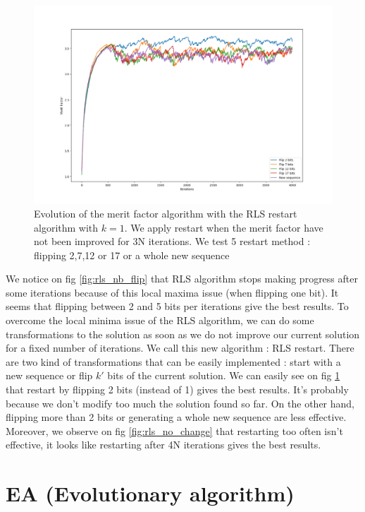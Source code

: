 \documentclass[a4paper,11pt,openany]{article}
\begin{document}
\begin{figure}[H]
\begin{center}
\includegraphics[scale=0.25]{Images/rls_restart}
\caption{Evolution of the merit factor algorithm with the RLS restart algorithm with $k=1$. We apply restart when the merit factor have not been improved for 3N iterations. We test 5 restart method : flipping 2,7,12 or 17 or a whole new sequence}
\label{fig:rls_restart}
\end{center}
\end{figure}
\noindent
We notice on fig \ref{fig:rls_nb_flip} that RLS algorithm stops making progress after some iterations because of this local maxima issue (when flipping one bit). It seems that flipping between 2 and 5 bits per iterations give the best results.
To overcome the local minima issue of the RLS algorithm, we can do some transformations to the solution as soon as we do not improve our current solution for a fixed number of iterations. We call this new algorithm : RLS restart. There are two kind of transformations that can be easily implemented : start with a new sequence or flip $k'$ bits of the current solution. We can easily see on fig \ref{fig:rls_restart} that restart by flipping 2 bits (instead of 1) gives the best results. It's probably because we don't modify too much the solution found so far. On the other hand, flipping more than 2 bits or generating a whole new sequence are less effective. Moreover, we observe on fig \ref{fig:rls_no_change} that restarting too often isn't effective, it looks like restarting after 4N iterations gives the best results.
\section{EA (Evolutionary algorithm)}
\end{document}
